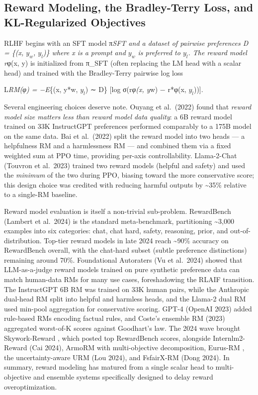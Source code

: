 \documentclass{article}
\begin{document}
\subsection{Reward Modeling, the Bradley-Terry Loss, and KL-Regularized Objectives}\label{reward-modeling-the-bradley-terry-loss-and-kl-regularized-objectives}

RLHF begins with an SFT model π\emph{SFT and a dataset of pairwise preferences D = \{(x, \(y_w\), \(y_l\))\} where x is a prompt and \(y_w\) is preferred to \(y_l\). The reward model r}φ(x, y) is initialized from π\_SFT (often replacing the LM head with a scalar head) and trained with the Bradley-Terry pairwise log loss

L\emph{RM(φ) = −E}\{(x, y*w, \(y_l\)) ∼ D\} {[}log σ(r\emph{φ(x, y}w) − r*φ(x, \(y_l\))){]}.

Several engineering choices deserve note. Ouyang et al.~(2022) found that \emph{reward model size matters less than reward model data quality}: a 6B reward model trained on 33K InstructGPT preferences performed comparably to a 175B model on the same data. Bai et al.~(2022) split the reward model into two heads --- a helpfulness RM and a harmlessness RM --- and combined them via a fixed weighted sum at PPO time, providing per-axis controllability. Llama-2-Chat (Touvron et al.~2023) trained two reward models (helpful and safety) and used the \emph{minimum} of the two during PPO, biasing toward the more conservative score; this design choice was credited with reducing harmful outputs by \textasciitilde35\% relative to a single-RM baseline.

Reward model evaluation is itself a non-trivial sub-problem. RewardBench (Lambert et al.~2024) is the standard meta-benchmark, partitioning \textasciitilde3,000 examples into six categories: chat, chat hard, safety, reasoning, prior, and out-of-distribution. Top-tier reward models in late 2024 reach \textasciitilde90\% accuracy on RewardBench overall, with the chat-hard subset (subtle preference distinctions) remaining around 70\%. Foundational Autoraters (Vu et al.~2024) showed that LLM-as-a-judge reward models trained on pure synthetic preference data can match human-data RMs for many use cases, foreshadowing the RLAIF transition. The InstructGPT 6B RM \citep{ouyang20222022} was trained on 33K human pairs, while the Anthropic dual-head RM \citep{bai20222022} split into helpful and harmless heads, and the Llama-2 dual RM \citep{touvron20232023} used min-pool aggregation for conservative scoring. GPT-4 (OpenAI 2023) added rule-based RMs encoding factual rules, and Coste's ensemble RM (2023) aggregated worst-of-K scores against Goodhart's law. The 2024 wave brought Skywork-Reward \citep{liu2023statisticalrejecti}, which posted top RewardBench scores, alongside Internlm2-Reward (Cai 2024), ArmoRM \citep{wang2024cdevalabenchmarkfo} with multi-objective decomposition, Eurus-RM \citep{yuan2023rrhfrankresponsest}, the uncertainty-aware URM (Lou 2024), and FsfairX-RM (Dong 2024). In summary, reward modeling has matured from a single scalar head to multi-objective and ensemble systems specifically designed to delay reward overoptimization.
\end{document}

